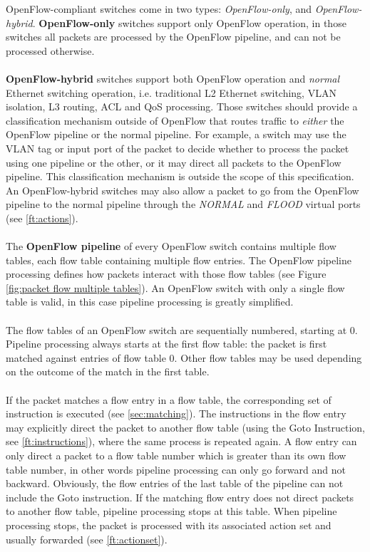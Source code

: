 \documentclass[10pt]{article}
\begin{document}
OpenFlow-compliant switches come in two types: \emph{OpenFlow-only}, and \emph{OpenFlow-hybrid}. \textbf{OpenFlow-only} switches support only OpenFlow operation, in those switches all packets are processed by the OpenFlow pipeline, and can not be processed otherwise.
\\\\
\textbf{OpenFlow-hybrid} switches support both OpenFlow operation and \emph{normal} Ethernet switching operation, i.e. traditional L2 Ethernet switching, VLAN isolation, L3 routing, ACL and QoS processing. Those switches should provide a classification mechanism outside of OpenFlow that routes traffic to \emph{either} the OpenFlow pipeline or the normal pipeline. For example, a switch may use the VLAN tag or input port of the packet to decide whether to process the packet using one pipeline or the other, or it may direct all packets to the OpenFlow pipeline. This classification mechanism is outside the scope of this specification. An OpenFlow-hybrid switches may also allow a packet to go from the OpenFlow pipeline to the normal pipeline through the \emph{NORMAL} and \emph{FLOOD} virtual ports (see \ref{ft:actions}).
\\\\
The \textbf{OpenFlow pipeline} of every OpenFlow switch contains multiple flow tables, each flow table containing multiple flow entries. The OpenFlow pipeline processing defines how packets interact with those flow tables (see Figure \ref{fig:packet flow multiple tables}). An OpenFlow switch with only a single flow table is valid, in this case pipeline processing is greatly simplified.
\\\\
The flow tables of an OpenFlow switch are sequentially numbered, starting at 0. Pipeline processing always starts at the first flow table: the packet is first matched against entries of flow table 0. Other flow tables may be used depending on the outcome of the match in the first table.
\\\\
If the packet matches a flow entry in a flow table, the corresponding set of instruction is executed (see \ref{sec:matching}). The instructions in the flow entry may explicitly direct the packet to another flow table (using the Goto Instruction, see \ref{ft:instructions}), where the same process is repeated again. A flow entry can only direct a packet to a flow table number which is greater than its own flow table number, in other words pipeline processing can only go forward and not backward. Obviously, the flow entries of the last table of the pipeline can not include the Goto instruction. If the matching flow entry does not direct packets to another flow table, pipeline processing stops at this table. When pipeline processing stops, the packet is processed with its associated action set and usually forwarded (see \ref{ft:actionset}).
\end{document}

